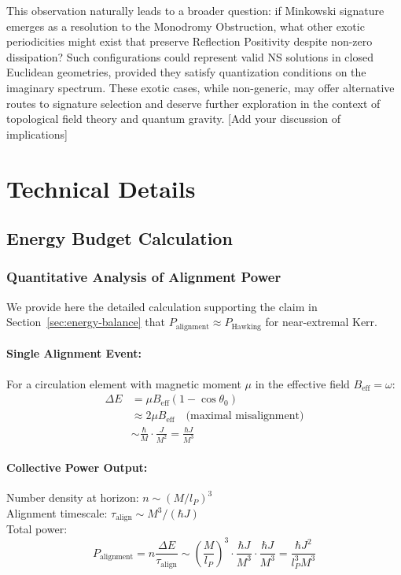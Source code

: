 \documentclass[11pt]{article}
\begin{document}
This observation naturally leads to a broader question: if Minkowski signature emerges as a resolution to the Monodromy Obstruction, what other exotic periodicities might exist that preserve Reflection Positivity despite non-zero dissipation? Such configurations could represent valid NS solutions in closed Euclidean geometries, provided they satisfy quantization conditions on the imaginary spectrum. These exotic cases, while non-generic, may offer alternative routes to signature selection and deserve further exploration in the context of topological field theory and quantum gravity.
[Add your discussion of implications]




\appendix
\section{Technical Details}




\subsection{Energy Budget Calculation}\label{app:energy-budget}

\subsubsection{Quantitative Analysis of Alignment Power}

We provide here the detailed calculation supporting the claim in Section~\ref{sec:energy-balance} that $P_{\text{alignment}} \approx P_{\text{Hawking}}$ for near-extremal Kerr.

\paragraph{Single Alignment Event:}
For a circulation element with magnetic moment $\mu$ in the effective field $B_{\text{eff}} = \omega$:
\begin{align}
\Delta E &= \mu B_{\text{eff}}(1 - \cos\theta_0)\\
&\approx 2\mu B_{\text{eff}} \quad \text{(maximal misalignment)}\\
&\sim \frac{\hbar}{M} \cdot \frac{J}{M^2} = \frac{\hbar J}{M^3}
\end{align}

\paragraph{Collective Power Output:}
Number density at horizon: $n \sim (M/l_P)^3$\\
Alignment timescale: $\tau_{\text{align}} \sim M^3/(\hbar J)$\\
Total power:
\begin{equation}
P_{\text{alignment}} = n\frac{\Delta E}{\tau_{\text{align}}} \sim \left(\frac{M}{l_P}\right)^3 \cdot \frac{\hbar J}{M^3} \cdot \frac{\hbar J}{M^3} = \frac{\hbar J^2}{l_P^3 M^3}
\end{equation}
\end{document}
